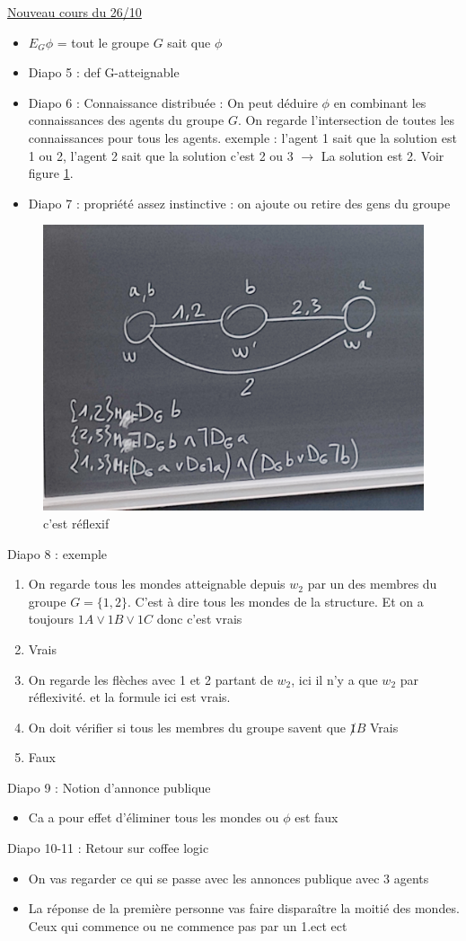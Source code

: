 \documentclass{article}
\theoremstyle{plain}%
\theoremstyle{definition}
\theoremstyle{remark}
\begin{document}
\underline{Nouveau cours du 26/10} \\
\begin{itemize}
    \item $ E_G \phi $ = tout le groupe $ G $ sait que $ \phi  $
    \item Diapo 5 : def G-atteignable 
    \item Diapo 6 : Connaissance distribuée : On peut déduire $ \phi  $ en combinant les connaissances des agents du groupe $ G $. On regarde l'intersection de toutes les connaissances pour tous les agents. exemple : l'agent 1 sait que la solution est 1 ou 2, l'agent 2 sait que la solution c'est 2 ou 3 $\rightarrow$ La solution est 2. Voir figure \ref{exmp1}.
    \item Diapo 7 : propriété assez instinctive : on ajoute ou retire des gens du groupe
\end{itemize}
\begin{figure}[htbp]
    \centering
    \includegraphics*[width=.5\textwidth]{./exmp1.jpg}
    \caption[]{c'est réflexif}
    \label{exmp1}
\end{figure}

Diapo 8 : exemple
\begin{enumerate}
    \item On regarde tous les mondes atteignable depuis $ w_2 $ par un des membres du groupe $ G = \{1,2\}$. C'est à dire tous les mondes de la structure. Et on a toujours $ 1A \vee 1B \vee 1C $ donc c'est vrais
    \item Vrais
    \item On regarde les flèches avec 1 et 2 partant de $ w_2 $, ici il n'y a que $ w_2 $ par réflexivité. et la formule ici est vrais.
    \item On doit vérifier si tous les membres du groupe savent que $ \not  1B $ Vrais
    \item Faux
\end{enumerate}
Diapo 9 : Notion d'annonce publique 
\begin{itemize}
    \item Ca a pour effet d'éliminer tous les mondes ou $ \phi  $ est faux
\end{itemize}
Diapo 10-11 : Retour sur coffee logic 
\begin{itemize}
    \item On vas regarder ce qui se passe avec les annonces publique avec 3 agents
    \item La réponse de la première personne vas faire disparaître la moitié des mondes. Ceux qui commence ou ne commence pas par un 1.ect ect
\end{itemize}
\end{document}
